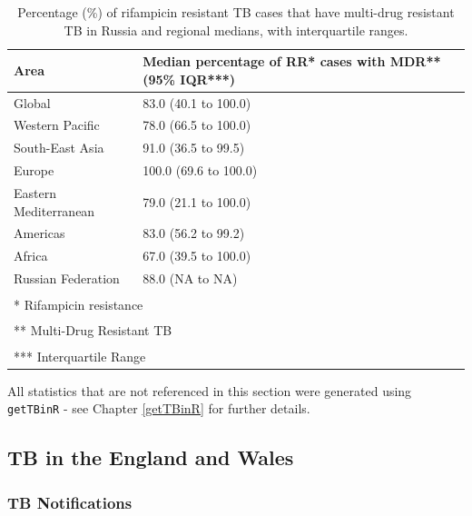 \documentclass[11pt,twoside]{bristolthesis}
\begin{document}
  \begin{table}[!h]
  
  \caption{\label{tab:prop-rr-with-mdr-tab}Percentage (\%) of rifampicin resistant TB cases that have multi-drug resistant TB in Russia and regional medians, with interquartile ranges.}
  \centering
  \begin{tabular}{ll}
  \toprule
  Area & Median percentage of RR* cases with MDR** (95\% IQR***)\\
  \midrule
  Global & 83.0 (40.1 to 100.0)\\
  Western Pacific & 78.0 (66.5 to 100.0)\\
  South-East Asia & 91.0 (36.5 to 99.5)\\
  Europe & 100.0 (69.6 to 100.0)\\
  Eastern Mediterranean & 79.0 (21.1 to 100.0)\\
  \addlinespace
  Americas & 83.0 (56.2 to 99.2)\\
  Africa & 67.0 (39.5 to 100.0)\\
  Russian Federation & 88.0 (NA to NA)\\
  \bottomrule
  \multicolumn{2}{l}{\textsuperscript{} * Rifampicin resistance}\\
  \multicolumn{2}{l}{\textsuperscript{} ** Multi-Drug Resistant TB}\\
  \multicolumn{2}{l}{\textsuperscript{} *** Interquartile Range}\\
  \end{tabular}
  \end{table}
  All statistics that are not referenced in this section were generated using \texttt{getTBinR} - see Chapter \ref{getTBinR} for further details.
  
  \hypertarget{tb-in-the-england-and-wales}{%
  \subsection{TB in the England and Wales}\label{tb-in-the-england-and-wales}}
  
  \hypertarget{tb-notifications}{%
  \subsubsection{TB Notifications}\label{tb-notifications}}
  
\end{document}
